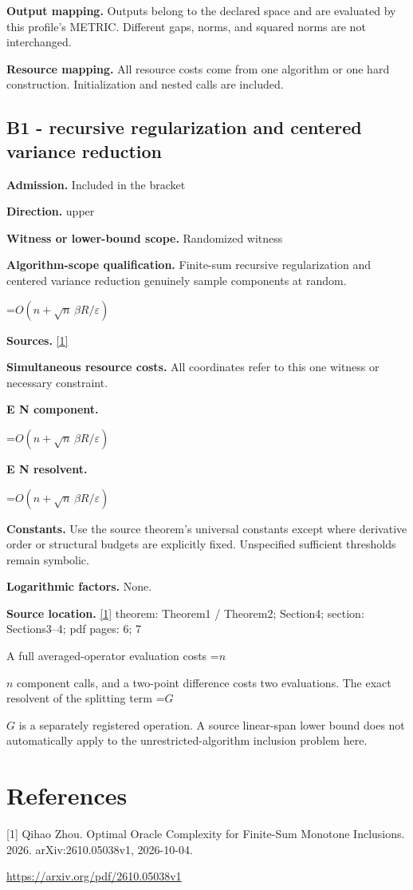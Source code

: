 \documentclass[10pt,a4paper]{article}
\newcommand{\AtlasMath}[1]{\par\begingroup\centering\setbox0=\hbox{$\displaystyle #1$}\ifdim\wd0>1.4\linewidth\typeout{ATLAS WIDE FORMULA: \the\wd0}\fi\ifdim\wd0>\linewidth\resizebox{\linewidth}{!}{\box0}\else\box0\fi\par\endgroup}
\newcommand{\AtlasInlineMath}[1]{\begingroup\setbox0=\hbox{$#1$}\ifdim\wd0>.4\linewidth\endgroup\AtlasMath{#1}\else\endgroup$#1$\fi}
\begin{document}
\textbf{Output mapping.} Outputs belong to the declared space and are evaluated by this profile's METRIC. Different gaps, norms, and squared norms are not interchanged.

\textbf{Resource mapping.} All resource costs come from one algorithm or one hard construction. Initialization and nested calls are included.

\subsection{B1 - recursive regularization and centered variance reduction}
\textbf{Admission.} Included in the bracket

\textbf{Direction.} upper

\textbf{Witness or lower-bound scope.} Randomized witness

\textbf{Algorithm-scope qualification.} Finite-sum recursive regularization and centered variance reduction genuinely sample components at random.

\AtlasMath{O(n+\sqrt n\,\beta R/\varepsilon)}
\textbf{Sources.} \href{https://arxiv.org/pdf/2610.05038v1}{[1]}

\textbf{Simultaneous resource costs.} All coordinates refer to this one witness or necessary constraint.

\textbf{E N component.}

\AtlasMath{O(n+\sqrt n\,\beta R/\varepsilon)}
\textbf{E N resolvent.}

\AtlasMath{O(n+\sqrt n\,\beta R/\varepsilon)}
\textbf{Constants.} Use the source theorem’s universal constants except where derivative order or structural budgets are explicitly fixed. Unspecified sufficient thresholds remain symbolic.

\textbf{Logarithmic factors.} None.

\textbf{Source location.} \href{https://arxiv.org/pdf/2610.05038v1}{[1]} theorem: Theorem1 / Theorem2; Section4; section: Sections3--4; pdf pages: 6; 7

A full averaged-operator evaluation costs \AtlasInlineMath{n} component calls, and a two-point difference costs two evaluations. The exact resolvent of the splitting term \AtlasInlineMath{G} is a separately registered operation. A source linear-span lower bound does not automatically apply to the unrestricted-algorithm inclusion problem here.

\section{References}
[1] Qihao Zhou. Optimal Oracle Complexity for Finite-Sum Monotone Inclusions. 2026. arXiv:2610.05038v1, 2026-10-04.

\url{https://arxiv.org/pdf/2610.05038v1}
\end{document}
